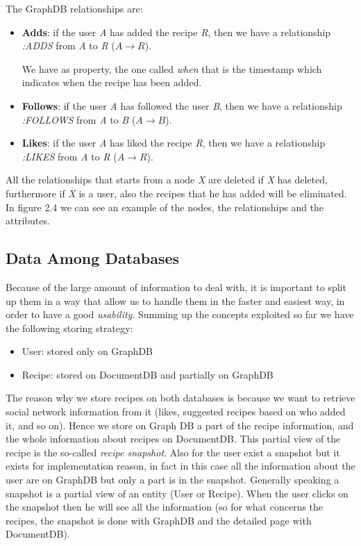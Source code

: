 \documentclass[a4paper]{report}
\begin{document}
\noindent The GraphDB relationships are:
\begin{itemize}
	\item \textbf{Adds}: if the user \emph{A} has added the recipe \emph{R}, then we have a relationship \emph{:ADDS} from \emph{A} to \emph{R} ($A \rightarrow R$).
	
	\noindent We have as property, the one called \emph{when} that is the timestamp which indicates when the recipe has been added.
	
	\item \textbf{Follows}: if the user \emph{A} has followed the user \emph{B}, then we have a relationship \emph{:FOLLOWS} from \emph{A} to \emph{B} ($A \rightarrow B$).
	
	\item \textbf{Likes}: if the user \emph{A} has liked the recipe \emph{R}, then we have a relationship \emph{:LIKES} from \emph{A} to \emph{R} ($A \rightarrow R$).
\end{itemize}  

\noindent All the relationships that starts from a node \emph{X} are deleted if \emph{X} has deleted, furthermore if \emph{X} is a user, also the recipes that he has added will be eliminated. In figure 2.4 we can see an example of the nodes, the relationships and the attributes.


\subsection{Data Among Databases}
Because of the large amount of information to deal with, it is important to split up them in a way that allow us to handle them in the faster and easiest way, in order to have a good \emph{usability}. Summing up the concepts exploited so far we have the following storing strategy:
\begin{itemize}
	\item User: stored only on GraphDB
	\item Recipe: stored on DocumentDB and partially on GraphDB
\end{itemize}

\noindent The reason why we store recipes on both databases is because we want to retrieve social network information from it (likes, suggested recipes based on who added it, and so on). Hence we store on Graph DB a part of the recipe information, and the whole information about recipes on DocumentDB. This partial view of the recipe is the so-called \emph{recipe snapshot}. Also for the user exist a snapshot but it exists for implementation reason, in fact in this case all the information about the user are on GraphDB but only a part is in the snapshot. Generally speaking a snapshot is a partial view of an entity (User or Recipe). When the user clicks on the snapshot then he will see all the information (so for what concerns the recipes, the snapshot is done with GraphDB and the detailed page with DocumentDB).
\end{document}
